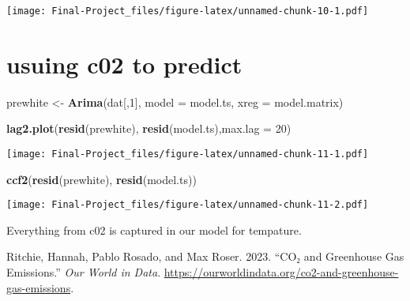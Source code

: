 \documentclass[
]{article}
\newenvironment{Shaded}{\begin{snugshade}}{\end{snugshade}}
\newcommand{\AttributeTok}[1]{\textcolor[rgb]{0.13,0.29,0.53}{#1}}
\newcommand{\DecValTok}[1]{\textcolor[rgb]{0.00,0.00,0.81}{#1}}
\newcommand{\FunctionTok}[1]{\textcolor[rgb]{0.13,0.29,0.53}{\textbf{#1}}}
\newcommand{\NormalTok}[1]{#1}
\newcommand{\OtherTok}[1]{\textcolor[rgb]{0.56,0.35,0.01}{#1}}
\newlength{\cslhangindent}
\newlength{\cslentryspacingunit} %
\newenvironment{CSLReferences}[2] %
 {%
  \setlength{\parindent}{0pt}
  \ifodd #1
  \let\oldpar\par
  \def\par{\hangindent=\cslhangindent\oldpar}
  \fi
  \setlength{\parskip}{#2\cslentryspacingunit}
 }%
 {}
\begin{document}
\texttt{[image: Final-Project\_files/figure-latex/unnamed-chunk-10-1.pdf]}

\hypertarget{usuing-c02-to-predict}{%
\section{usuing c02 to predict}\label{usuing-c02-to-predict}}

\begin{Shaded}
\begin{Highlighting}[]
\NormalTok{prewhite }\OtherTok{\textless{}{-}} \FunctionTok{Arima}\NormalTok{(dat[,}\DecValTok{1}\NormalTok{], }\AttributeTok{model =}\NormalTok{ model.ts, }\AttributeTok{xreg =}\NormalTok{ model.matrix)}


\FunctionTok{lag2.plot}\NormalTok{(}\FunctionTok{resid}\NormalTok{(prewhite), }\FunctionTok{resid}\NormalTok{(model.ts),}\AttributeTok{max.lag =} \DecValTok{20}\NormalTok{)}
\end{Highlighting}
\end{Shaded}

\texttt{[image: Final-Project\_files/figure-latex/unnamed-chunk-11-1.pdf]}

\begin{Shaded}
\begin{Highlighting}[]
\FunctionTok{ccf2}\NormalTok{(}\FunctionTok{resid}\NormalTok{(prewhite), }\FunctionTok{resid}\NormalTok{(model.ts))}
\end{Highlighting}
\end{Shaded}

\texttt{[image: Final-Project\_files/figure-latex/unnamed-chunk-11-2.pdf]}

Everything from c02 is captured in our model for tempature.

\hypertarget{refs}{}
\begin{CSLReferences}{1}{0}
\leavevmode{}%
Ritchie, Hannah, Pablo Rosado, and Max Roser. 2023. {``CO₂ and
Greenhouse Gas Emissions.''} \emph{Our World in Data}.
\url{https://ourworldindata.org/co2-and-greenhouse-gas-emissions}.

\end{CSLReferences}
\end{document}
